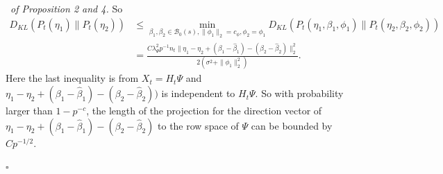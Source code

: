 \documentclass[12pt]{article}
\newenvironment{pf}{{\noindent \it Proof}\ }{\hfill $\square$\par}
\begin{document}
\begin{pf}{\it of Proposition 2 and 4. }
    So
    \begin{align*}
        D_{KL}(P_t(\eta_1)\|P_t(\eta_2)) &\le \min_{\beta_1,\beta_2\in \mathcal{B}_0(s),\|\phi_1\|_2=c_\phi,\phi_2=\phi_1} D_{KL}(P_t(\eta_1,\beta_1,\phi_1)\|P_t(\eta_2,\beta_2,\phi_2))\\&= 
         \frac{C\lambda_\Psi^2 p^{-1}n_t\|\eta_1-\eta_2+ (\beta_1 -\hat{\beta}_1) - (\beta_2 -\hat{\beta}_2)\|^2_2}{2(\sigma^2 + \|\phi_1\|_2^2)}. 
    \end{align*}
    Here the last inequality is from $X_t = H_t\Psi$ and $\eta_1-\eta_2+ (\beta_1 -\hat{\beta}_1) - (\beta_2 -\hat{\beta}_2))$ is independent to $H_t\Psi$. So with probability larger than $1-p^{-c}$, the length of the projection for the direction vector of $\eta_1-\eta_2+ (\beta_1 -\hat{\beta}_1) - (\beta_2 -\hat{\beta}_2)$ to the row space of $\Psi$ can be bounded by $C p^{-1/2}$. 


\end{pf}
\end{document}
